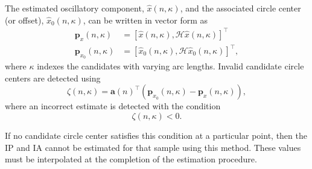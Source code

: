 \documentclass[journal,11pt,a4paper,onecolumn,draftcls]{IEEEtran}
\begin{document}
The estimated oscillatory component, $\hat{x}(n,\kappa)$, and the associated circle center (or offset), $\hat{x}_0(n,\kappa)$, can be written in vector form as
\begin{align}
	\mathbf{p}_x(n,\kappa) &= \left[\hat{x}\left(n,\kappa\right),\mathcal{H}\hat{x}\left(n,\kappa\right)\right]^{\top} \\ 
	\mathbf{p}_{x_0}\left(n,\kappa\right) &= \left[\hat{x}_0\left(n,\kappa\right), \mathcal{H}\hat{x}_0\left(n,\kappa\right)\right]^{\top}, 
\end{align}
where $\kappa$ indexes the candidates with varying arc lengths. Invalid candidate circle centers are detected using 
\begin{equation}
    \zeta(n,\kappa) = \mathbf{a}\left( n\right)^{\top}\left( \mathbf{p}_{x_0}\left( n,\kappa \right) - \mathbf{p}_x\left( n,\kappa \right) \right),
\end{equation}
where an incorrect estimate is detected with the condition
\begin{equation}\label{eq:IncorrectSideClassifier}
    \zeta(n,\kappa) < 0.
\end{equation} 

If no candidate circle center satisfies this condition at a particular point, then the IP and IA cannot be estimated for that sample using this method. These values must be interpolated at the completion of the estimation procedure. 
\end{document}
